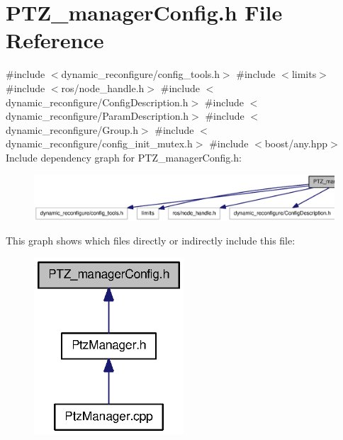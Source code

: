 \section{\-P\-T\-Z\-\_\-manager\-Config.\-h \-File \-Reference}
\label{PTZ__managerConfig_8h}
{\ttfamily \#include $<$dynamic\-\_\-reconfigure/config\-\_\-tools.\-h$>$}\*
{\ttfamily \#include $<$limits$>$}\*
{\ttfamily \#include $<$ros/node\-\_\-handle.\-h$>$}\*
{\ttfamily \#include $<$dynamic\-\_\-reconfigure/\-Config\-Description.\-h$>$}\*
{\ttfamily \#include $<$dynamic\-\_\-reconfigure/\-Param\-Description.\-h$>$}\*
{\ttfamily \#include $<$dynamic\-\_\-reconfigure/\-Group.\-h$>$}\*
{\ttfamily \#include $<$dynamic\-\_\-reconfigure/config\-\_\-init\-\_\-mutex.\-h$>$}\*
{\ttfamily \#include $<$boost/any.\-hpp$>$}\*
\-Include dependency graph for \-P\-T\-Z\-\_\-manager\-Config.\-h\-:
\nopagebreak
\begin{figure}[H]
\begin{center}
\leavevmode
\includegraphics[width=350pt]{PTZ__managerConfig_8h__incl}
\end{center}
\end{figure}
\-This graph shows which files directly or indirectly include this file\-:
\nopagebreak
\begin{figure}[H]
\begin{center}
\leavevmode
\includegraphics[width=158pt]{PTZ__managerConfig_8h__dep__incl}
\end{center}
\end{figure}
